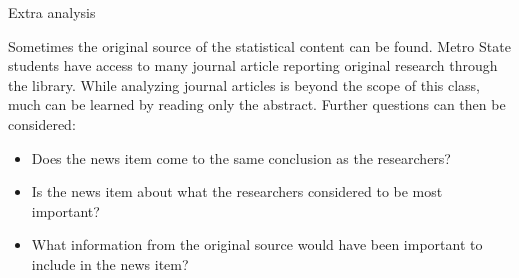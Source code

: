 \documentclass[xcolor=table, aspectratio=169, bigger]{beamer}
\begin{document}
\begin{frame}{Extra analysis}
\begin{block}{}
Sometimes the original source of the statistical content can be found. Metro State students have access to many journal article reporting original research through the library. While analyzing journal articles is beyond the scope of this class, much can be learned by reading only the abstract. Further questions can then be considered:
\begin{itemize}
\item Does the news item come to the same conclusion as the researchers?
\item Is the news item about what the researchers considered to be most important?
\item What information from the original source would have been important to include in the news item?
\end{itemize}
\end{block}
\end{frame}
\end{document}
